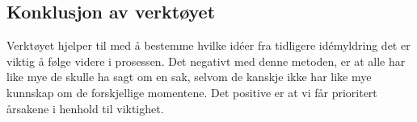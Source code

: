 \subsection{Konklusjon av verktøyet}
Verktøyet hjelper til med å bestemme hvilke idéer fra tidligere idémyldring det er viktig å følge videre i prosessen. Det negativt med denne metoden, er at alle har like mye de skulle ha sagt om en sak, selvom de kanskje ikke har like mye kunnskap om de forskjellige momentene. Det positive er at vi får prioritert årsakene i henhold til viktighet. 